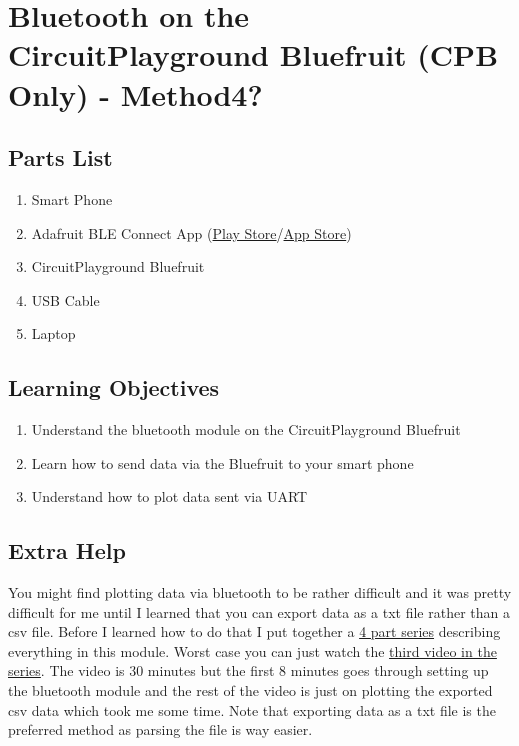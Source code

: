 \newpage

\section{Bluetooth on the CircuitPlayground Bluefruit (CPB Only) - Method4?}
\label{s:Bluetooth}

\subsection{Parts List}

\begin{enumerate}[itemsep=-5pt]
\item Smart Phone
\item Adafruit BLE Connect App (\href{https://play.google.com/store/apps/details?id=com.adafruit.bluefruit.le.connect}{Play Store}/\href{https://apps.apple.com/us/app/bluefruit-connect/id830125974}{App Store})
\item CircuitPlayground Bluefruit
\item USB Cable
\item Laptop
\end{enumerate}

\subsection{Learning Objectives}
\begin{enumerate}[itemsep=-5pt]
\item Understand the bluetooth module on the CircuitPlayground Bluefruit
\item Learn how to send data via the Bluefruit to your smart phone
\item Understand how to plot data sent via UART
\end{enumerate}

\subsection{Extra Help}

You might find plotting data via bluetooth to be rather difficult and
it was pretty difficult for me until I learned that you can export
data as a txt file rather than a csv file. Before I learned how to do
that I put together
a \href{https://www.youtube.com/playlist?list=PL_D7_GvGz-v0-U3JACRMgldvqQqn2mje9}{4
part series} describing everything in this module. Worst case you can
just watch
the \href{https://www.youtube.com/watch?v=9EHNFdVX9O8&list=PL_D7_GvGz-v0-U3JACRMgldvqQqn2mje9&index=3}{third
video in the series}. The video is 30 minutes but the first 8 minutes
goes through setting up the bluetooth module and the rest of the video
is just on plotting the exported csv data which took me some
time. Note that exporting data as a txt file is the preferred method
as parsing the file is way easier. 

